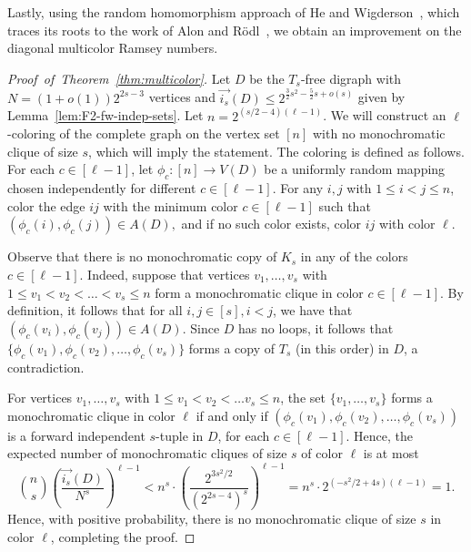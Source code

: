 \documentclass{article}
\theoremstyle{plain}
\theoremstyle{definition}
\newcommand{\fwi}[1]{\overrightarrow{i_{#1}}}
\begin{document}
Lastly, using the random homomorphism approach of He and Wigderson~\cite{he-wigderson}, which traces its roots to the work of Alon and R\"{o}dl~\cite{alon-rodl}, we obtain an improvement on the diagonal multicolor Ramsey numbers.
\begin{proof}[Proof~of~Theorem~\ref{thm:multicolor}]
    Let $D$ be the $T_s$-free digraph with $N = (1+o(1)) 2^{2s-3}$ vertices and $\fwi{s}(D) \le 2^{\frac{3}{2}s^2 - \frac{5}{2}s + o(s)}$ given by Lemma~\ref{lem:F2-fw-indep-sets}. Let $n = 2^{(s/2 - 4)(\ell-1)}$. We will construct an $\ell$-coloring of the complete graph on the vertex set $[n]$ with no monochromatic clique of size $s$, which will imply the statement. The coloring is defined as follows. For each $c \in [\ell-1]$, let $\phi_c \colon [n] \rightarrow V(D)$ be a uniformly random mapping chosen independently for different $c \in [\ell-1]$. For any $i, j$ with $1 \le i < j \le n$, color the edge $ij$ with the minimum color $c \in [\ell-1]$ such that $(\phi_c(i), \phi_c(j)) \in A(D),$ and if no such color exists, color $ij$ with color $\ell$.

    Observe that there is no monochromatic copy of $K_s$ in any of the colors $c \in [\ell-1]$. Indeed, suppose that vertices $v_1, \dots, v_s$ with $1 \le v_1 < v_2 < \dots < v_s \le n$ form a monochromatic clique in color $c \in [\ell-1].$ By definition, it follows that for all $i, j \in [s], i<j$, we have that $(\phi_c(v_i), \phi_c(v_j)) \in A(D)$. Since $D$ has no loops, it follows that $\{\phi_c(v_1), \phi_c(v_2), \dots, \phi_c(v_s)\}$ forms a copy of $T_s$ (in this order) in $D$, a contradiction.

    For vertices $v_1, \dots, v_s$ with $1 \le v_1 < v_2 < \dots v_s \le n$, the set $\{v_1, \dots, v_s\}$ forms a monochromatic clique in color $\ell$ if and only if $(\phi_c(v_1), \phi_c(v_2), \dots, \phi_c(v_s))$ is a forward independent $s$-tuple in $D$, for each $c \in [\ell-1]$. Hence, the expected number of monochromatic cliques of size $s$ of color $\ell$ is at most
    \[ \binom{n}{s} \left( \frac{\fwi{s}(D)}{N^s} \right)^{\ell-1} < n^s \cdot \left( \frac{2^{3s^2 / 2}}{(2^{2s-4})^s} \right)^{\ell-1} = n^s \cdot 2^{(-s^2/2 + 4s)(\ell-1)} = 1. \]
    Hence, with positive probability, there is no monochromatic clique of size $s$ in color $\ell$, completing the proof.
\end{proof}
\end{document}
